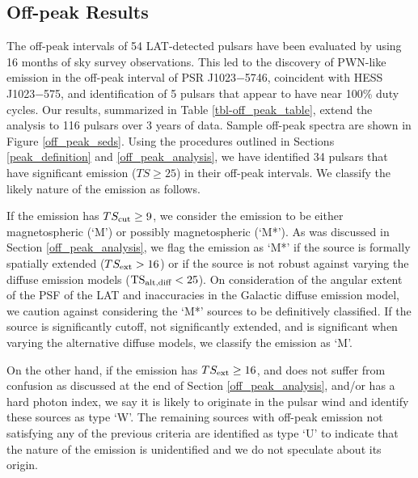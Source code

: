 \subsection{Off-peak Results}

The off-peak intervals of 54 LAT-detected pulsars have
been evaluated by \citet{LAT_collaboration_PWNCAT_2011} using 16 months of sky survey observations.  
This led to the discovery of PWN-like emission
in the off-peak interval of PSR J1023$-$5746, coincident with HESS
J1023$-$575, and identification of 5 pulsars that appear to have near 100\%
duty cycles.  Our results, summarized in Table \ref{tbl-off_peak_table},
extend the analysis to 116 pulsars over 3 years of data.  
Sample off-peak spectra are shown in Figure \ref{off_peak_seds}.
Using the procedures outlined in Sections \ref{peak_definition}
and \ref{off_peak_analysis}, we have identified 34 pulsars that
have significant emission ($TS\geq25$) in their off-peak intervals.
We classify the likely nature of the emission as follows.

If the emission has $TS_{\rm cut}\geq9$, we consider the emission to be
either magnetospheric (`M') or possibly magnetospheric (`M*').
As was discussed in Section \ref{off_peak_analysis}, 
we flag the emission as `M*' if the source is formally spatially extended
($TS_{\rm ext}>16$) or if the source is not robust against varying
the diffuse emission models ($\mathrm{TS}_{\text{alt,diff}}<25$). 
On consideration of the angular extent of the PSF of the LAT and inaccuracies in the Galactic diffuse
emission model, we caution against considering the `M*' sources to be definitively classified.
If the source is significantly cutoff, not
significantly extended, and is significant when varying the alternative diffuse models,
we classify the emission as `M'.


On the other hand, if the
emission has $TS_{\rm ext}\geq16$, and does not suffer from confusion as
discussed at the end of Section \ref{off_peak_analysis}, and/or has a hard
photon index, we say it is likely
to originate in the pulsar wind and identify these sources as type `W'.
The remaining sources with off-peak emission not satisfying any of the
previous criteria are identified as type `U' to indicate that the nature
of the emission is unidentified and we do not speculate about its origin.


